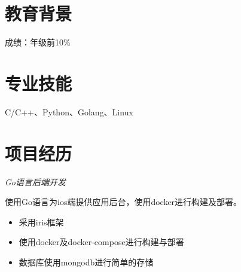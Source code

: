 \documentclass{uniquecv}
\begin{document}
\medskip




\section{教育背景}
成绩：年级前10\% %



\section{专业技能}
\smallskip
C/C++、Python、Golang、Linux





\section{项目经历}


\textit{Go语言后端开发}
\vspace{0.4ex}

使用Go语言为ios端提供应用后台，使用docker进行构建及部署。

\begin{itemize}
  \item 采用iris框架
  \item 使用docker及docker-compose进行构建与部署
  \item 数据库使用mongodb进行简单的存储
\end{itemize}
\end{document}
